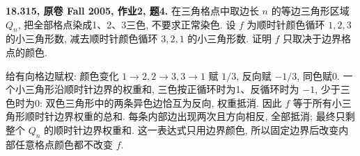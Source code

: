 \begin{exercise}\label{mit:18315-hw2-q4}
\textbf{18.315, 原卷 Fall 2005, 作业2, 题4.}
在三角格点中取边长 $n$ 的等边三角形区域 $Q_n$, 把全部格点染成1、2、3三色,
不要求正常染色. 设 $f$ 为顺时针颜色循环 $1,2,3$ 的小三角形数,
减去顺时针颜色循环 $3,2,1$ 的小三角形数.
证明 $f$ 只取决于边界格点的颜色.
\end{exercise}
\begin{solution}
给有向格边赋权: 颜色变化 $1\to2,2\to3,3\to1$ 赋 $1/3$,
反向赋 $-1/3$, 同色赋0. 一个小三角形沿顺时针边界的权重和,
三色按正循环时为1、反循环时为 $-1$, 少于三色时为0:
双色三角形中的两条异色边恰互为反向, 权重抵消.
因此 $f$ 等于所有小三角形顺时针边界权重的总和.
每条内部边出现两次且方向相反, 全部抵消;
最终只剩整个 $Q_n$ 的顺时针边界权重和.
这一表达式只用边界颜色, 所以固定边界后改变内部任意格点颜色都不改变 $f$.
\end{solution}

